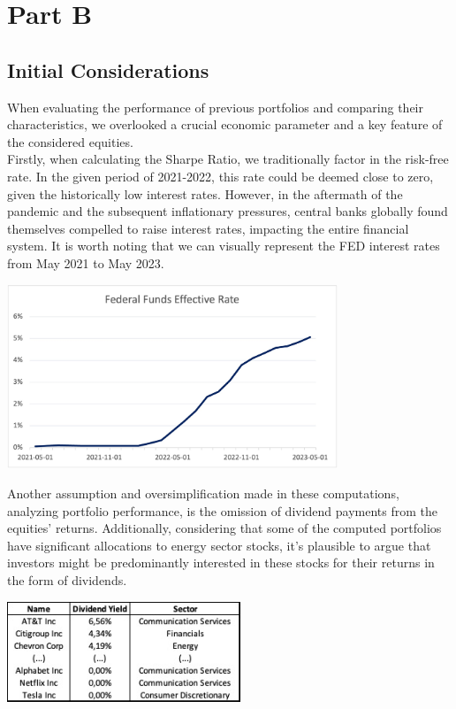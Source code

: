 \documentclass{assignment}
\begin{document}
\section*{Part B}

\subsection*{Initial Considerations}
When evaluating the performance of previous portfolios and comparing their characteristics, we overlooked a crucial economic parameter and a key feature of the considered equities.\\
Firstly, when calculating the Sharpe Ratio, we traditionally factor in the risk-free rate. In the given period of 2021-2022, this rate could be deemed close to zero, given the historically low interest rates. However, in the aftermath of the pandemic and the subsequent inflationary pressures, central banks globally found themselves compelled to raise interest rates, impacting the entire financial system. It is worth noting that we can visually represent the FED interest rates from May 2021 to May 2023.

\begin{center}
    \includegraphics[height=5.5cm]
    {assets/FEDRATES.jpg}
\end{center}

Another assumption and oversimplification made in these computations, analyzing portfolio performance, is the omission of dividend payments from the equities' returns. Additionally, considering that some of the computed portfolios have significant allocations to energy sector stocks, it's plausible to argue that investors might be predominantly interested in these stocks for their returns in the form of dividends.

\begin{center}
    \includegraphics[height=3cm]
    {assets/Divid.jpg}
\end{center}
\end{document}
